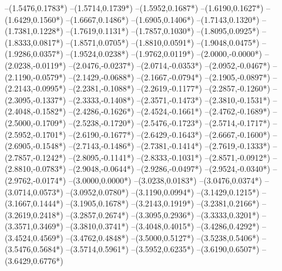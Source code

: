 {	--(1.5476,{0.1783*\yskala})
	--(1.5714,{0.1739*\yskala})
	--(1.5952,{0.1687*\yskala})
	--(1.6190,{0.1627*\yskala})
	--(1.6429,{0.1560*\yskala})
	--(1.6667,{0.1486*\yskala})
	--(1.6905,{0.1406*\yskala})
	--(1.7143,{0.1320*\yskala})
	--(1.7381,{0.1228*\yskala})
	--(1.7619,{0.1131*\yskala})
	--(1.7857,{0.1030*\yskala})
	--(1.8095,{0.0925*\yskala})
	--(1.8333,{0.0817*\yskala})
	--(1.8571,{0.0705*\yskala})
	--(1.8810,{0.0591*\yskala})
	--(1.9048,{0.0475*\yskala})
	--(1.9286,{0.0357*\yskala})
	--(1.9524,{0.0238*\yskala})
	--(1.9762,{0.0119*\yskala})
	--(2.0000,{-0.0000*\yskala})
	--(2.0238,{-0.0119*\yskala})
	--(2.0476,{-0.0237*\yskala})
	--(2.0714,{-0.0353*\yskala})
	--(2.0952,{-0.0467*\yskala})
	--(2.1190,{-0.0579*\yskala})
	--(2.1429,{-0.0688*\yskala})
	--(2.1667,{-0.0794*\yskala})
	--(2.1905,{-0.0897*\yskala})
	--(2.2143,{-0.0995*\yskala})
	--(2.2381,{-0.1088*\yskala})
	--(2.2619,{-0.1177*\yskala})
	--(2.2857,{-0.1260*\yskala})
	--(2.3095,{-0.1337*\yskala})
	--(2.3333,{-0.1408*\yskala})
	--(2.3571,{-0.1473*\yskala})
	--(2.3810,{-0.1531*\yskala})
	--(2.4048,{-0.1582*\yskala})
	--(2.4286,{-0.1626*\yskala})
	--(2.4524,{-0.1661*\yskala})
	--(2.4762,{-0.1689*\yskala})
	--(2.5000,{-0.1709*\yskala})
	--(2.5238,{-0.1720*\yskala})
	--(2.5476,{-0.1723*\yskala})
	--(2.5714,{-0.1717*\yskala})
	--(2.5952,{-0.1701*\yskala})
	--(2.6190,{-0.1677*\yskala})
	--(2.6429,{-0.1643*\yskala})
	--(2.6667,{-0.1600*\yskala})
	--(2.6905,{-0.1548*\yskala})
	--(2.7143,{-0.1486*\yskala})
	--(2.7381,{-0.1414*\yskala})
	--(2.7619,{-0.1333*\yskala})
	--(2.7857,{-0.1242*\yskala})
	--(2.8095,{-0.1141*\yskala})
	--(2.8333,{-0.1031*\yskala})
	--(2.8571,{-0.0912*\yskala})
	--(2.8810,{-0.0783*\yskala})
	--(2.9048,{-0.0644*\yskala})
	--(2.9286,{-0.0497*\yskala})
	--(2.9524,{-0.0340*\yskala})
	--(2.9762,{-0.0174*\yskala})
	--(3.0000,{0.0000*\yskala})
	--(3.0238,{0.0183*\yskala})
	--(3.0476,{0.0374*\yskala})
	--(3.0714,{0.0573*\yskala})
	--(3.0952,{0.0780*\yskala})
	--(3.1190,{0.0994*\yskala})
	--(3.1429,{0.1215*\yskala})
	--(3.1667,{0.1444*\yskala})
	--(3.1905,{0.1678*\yskala})
	--(3.2143,{0.1919*\yskala})
	--(3.2381,{0.2166*\yskala})
	--(3.2619,{0.2418*\yskala})
	--(3.2857,{0.2674*\yskala})
	--(3.3095,{0.2936*\yskala})
	--(3.3333,{0.3201*\yskala})
	--(3.3571,{0.3469*\yskala})
	--(3.3810,{0.3741*\yskala})
	--(3.4048,{0.4015*\yskala})
	--(3.4286,{0.4292*\yskala})
	--(3.4524,{0.4569*\yskala})
	--(3.4762,{0.4848*\yskala})
	--(3.5000,{0.5127*\yskala})
	--(3.5238,{0.5406*\yskala})
	--(3.5476,{0.5684*\yskala})
	--(3.5714,{0.5961*\yskala})
	--(3.5952,{0.6235*\yskala})
	--(3.6190,{0.6507*\yskala})
	--(3.6429,{0.6776*\yskala})
}
